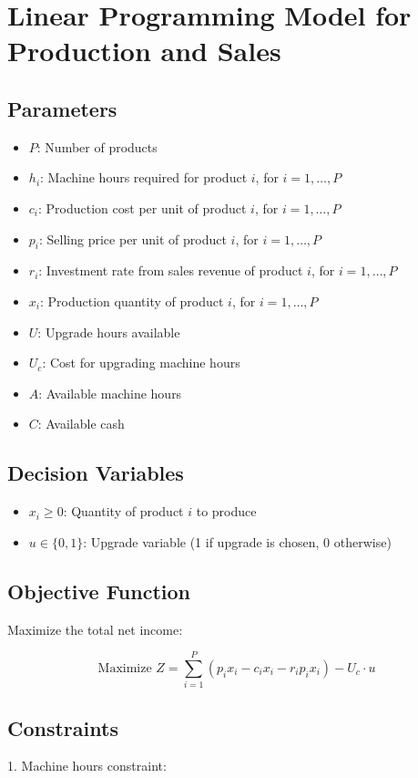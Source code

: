 \documentclass{article}
\begin{document}
\section*{Linear Programming Model for Production and Sales}

\subsection*{Parameters}
\begin{itemize}
    \item $P$: Number of products
    \item $h_i$: Machine hours required for product $i$, for $i = 1, \ldots, P$
    \item $c_i$: Production cost per unit of product $i$, for $i = 1, \ldots, P$
    \item $p_i$: Selling price per unit of product $i$, for $i = 1, \ldots, P$
    \item $r_i$: Investment rate from sales revenue of product $i$, for $i = 1, \ldots, P$
    \item $x_i$: Production quantity of product $i$, for $i = 1, \ldots, P$
    \item $U$: Upgrade hours available
    \item $U_c$: Cost for upgrading machine hours
    \item $A$: Available machine hours
    \item $C$: Available cash
\end{itemize}

\subsection*{Decision Variables}
\begin{itemize}
    \item $x_i \geq 0$: Quantity of product $i$ to produce
    \item $u \in \{0,1\}$: Upgrade variable (1 if upgrade is chosen, 0 otherwise)
\end{itemize}

\subsection*{Objective Function}
Maximize the total net income:

\[
\text{Maximize } Z = \sum_{i=1}^{P} \left( p_i x_i - c_i x_i - r_i p_i x_i \right) - U_c \cdot u
\]

\subsection*{Constraints}
1. Machine hours constraint:
\end{document}
